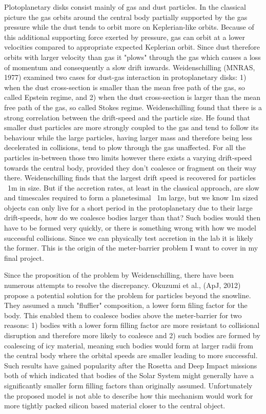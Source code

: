 \documentclass[12pt,letterpaper]{article}
\begin{document}
Plotoplanetary disks consist mainly of gas and dust particles. In the classical picture the gas orbits around the central body partially supported by the gas pressure while the dust tends to orbit more on Keplerian-like orbits. Because of this additional supporting force exerted by pressure, gas can orbit at a lower velocities compared to appropriate expected Keplerian orbit. Since dust therefore orbits with larger velocity than gas it "plows" through the gas which causes a loss of momentum and consequently a slow drift inwards. Weidenschilling (MNRAS, 1977) examined two cases for dust-gas interaction in protoplanetary disks: 1) when the dust cross-section is smaller than the mean free path of the gas, so called Epstein regime, and 2) when the dust cross-section is larger than the mean free path of the gas, so called Stokes regime. Weidenschilling found that there is a strong correlation between the drift-speed and the particle size. He found that smaller dust particles are more strongly coupled to the gas and tend to follow its behaviour while the large particles, having larger mass and therefore being less decelerated in collisions, tend to plow through the gas unaffected. For all the particles in-between those two limits however there exists a varying drift-speed towards the central body, provided they don't coalesce or fragment on their way there. Weidenschilling finds that the largest drift speed is recovered for particles ~1m in size. But if the accretion rates, at least in the classical approach, are slow and timescales required to form a planetesimal ~1m large, but we know 1m sized objects can only live for a short period in the protoplanetary due to their large drift-speeds, how do we coalesce bodies larger than that? Such bodies would then have to be formed very quickly, or there is something wrong with how we model successful collisions. Since we can physically test accretion in the lab it is likely the former. This is the origin of the meter-barrier problem I want to cover in my final project.

Since the proposition of the problem by Weidenschilling, there have been numerous attempts to resolve the discrepancy. Okuzumi et al., (ApJ, 2012) propose a potential solution for the problem for particles beyond the snowline. They assumed a much "fluffier" composition, a lower form filing factor for the body. This enabled them to coalesce bodies above the meter-barrier for two reasons: 1) bodies with a lower form filling factor are more resistant to collisional disruption and therefore more likely to coalesce and 2) such bodies are formed by coalescing of icy material, meaning such bodies would form at larger radii from the central body where the orbital speeds are smaller leading to more successful. Such results have gained popularity after the Rosetta and Deep Impact missions both of which indicated that bodies of the Solar System might generally have a significantly smaller form filling factors than originally assumed. Unfortunately the proposed model is not able to describe how this mechanism would work for more tightly packed silicon based material closer to the central object.
\end{document}
